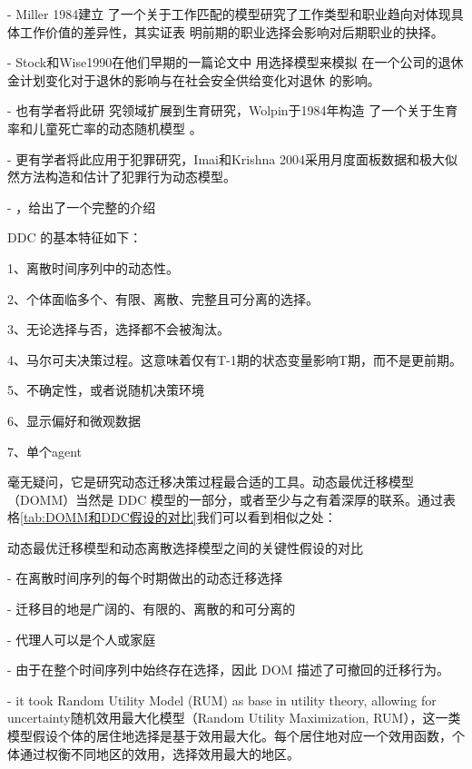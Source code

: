 \documentclass[a4paper,12pt,oneside]{book} %
\begin{document}
- Miller 1984建立 了一个关于工作匹配的模型研究了工作类型和职业趋向对体现具体工作价值的差异性，其实证表 明前期的职业选择会影响对后期职业的抉择。

- Stock和Wise1990在他们早期的一篇论文中 用选择模型来模拟  在一个公司的退休金计划变化对于退休的影响与在社会安全供给变化对退休 的影响。

- 也有学者将此研 究领域扩展到生育研究，Wolpin于1984年构造 了一个关于生育率和儿童死亡率的动态随机模型 。

- 更有学者将此应用于犯罪研究，Imai和Krishna 2004采用月度面板数据和极大似然方法构造和估计了犯罪行为动态模型。

- \cite{keaneEmpiricalApplicationsDiscrete2009}，\cite{aguirregabiriaDynamicDiscreteChoice2010}给出了一个完整的介绍





DDC 的基本特征如下：

1、离散时间序列中的动态性。

2、个体面临多个、有限、离散、完整且可分离的选择。

3、无论选择与否，选择都不会被淘汰。

4、马尔可夫决策过程。这意味着仅有T-1期的状态变量影响T期，而不是更前期。

5、不确定性，或者说随机决策环境

6、显示偏好和微观数据

7、单个agent



毫无疑问，它是研究动态迁移决策过程最合适的工具。动态最优迁移模型（DOMM）当然是 DDC 模型的一部分，或者至少与之有着深厚的联系。通过表格\ref{tab:DOMM和DDC假设的对比}我们可以看到相似之处：

\begin{table}

\caption{动态最优迁移模型和动态离散选择模型之间的关键性假设的对比}
\label{tab:DOMM和DDC假设的对比}  
\end{table}

- 在离散时间序列的每个时期做出的动态迁移选择

- 迁移目的地是广阔的、有限的、离散的和可分离的

- 代理人可以是个人或家庭

- 由于在整个时间序列中始终存在选择，因此 DOM 描述了可撤回的迁移行为。

- it took Random Utility Model (RUM) as base in utility theory, allowing for uncertainty随机效用最大化模型（Random Utility Maximization, RUM），这一类模型假设个体的居住地选择是基于效用最大化。每个居住地对应一个效用函数，个体通过权衡不同地区的效用，选择效用最大的地区。
\end{document}
